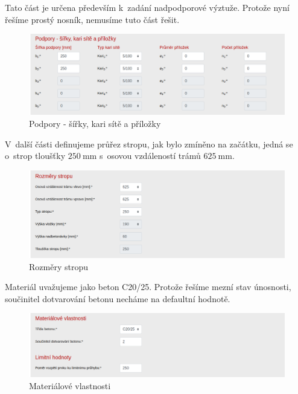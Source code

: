 Tato část je určena především k~zadání nadpodporové výztuže. Protože nyní řešíme prostý nosník, nemusíme tuto část řešit.
\begin{figure}[H]
    \includegraphics{assets/figures/wbapp/strop/02_podpory.png}
    \caption{Podpory - šířky, kari sítě a příložky}
    \label{fig:wb_app_podpory}
\end{figure}

V~další části definujeme průřez stropu, jak bylo zmíněno na začátku, jedná se o~strop tloušťky $\SI{250}{\milli\metre}$ s~osovou vzdáleností trámů $\SI{625}{\milli\metre}$.
\begin{figure}[H]
    \includegraphics{assets/figures/wbapp/strop/03_rozmery.png}
    \caption{Rozměry stropu}
    \label{fig:wb_app_rozmery_stropu}
\end{figure}

Materiál uvažujeme jako beton C20/25. Protože řešíme mezní stav únosnosti, součinitel dotvarování betonu necháme na defaultní hodnotě.
\begin{figure}[H]
    \includegraphics{assets/figures/wbapp/strop/04_material.png}
    \caption{Materiálové vlastnosti}
    \label{fig:wb_app_material}
\end{figure}

